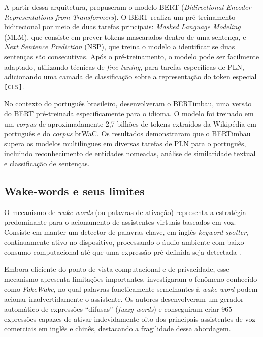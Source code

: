 \documentclass[
    12pt,                %
    openright,           %
    oneside,             %
    a4paper,             %
    english,             %
    brazil               %
]{abntex2}
\begin{document}
A partir dessa arquitetura,  propuseram o modelo BERT (\textit{Bidirectional Encoder Representations from Transformers}). O BERT realiza um pré-treinamento bidirecional por meio de duas tarefas principais: \textit{Masked Language Modeling} (MLM), que consiste em prever tokens mascarados dentro de uma sentença, e \textit{Next Sentence Prediction} (NSP), que treina o modelo a identificar se duas sentenças são consecutivas. Após o pré-treinamento, o modelo pode ser facilmente adaptado, utilizando técnicas de \textit{fine-tuning}, para tarefas específicas de PLN, adicionando uma camada de classificação sobre a representação do token especial \texttt{[CLS]}.

No contexto do português brasileiro,  desenvolveram o BERTimbau, uma versão do BERT pré-treinada especificamente para o idioma. O modelo foi treinado em um \textit{corpus} de aproximadamente 2,7 bilhões de tokens extraídos da Wikipédia em português e do \textit{corpus} brWaC. Os resultados demonstraram que o BERTimbau supera os modelos multilíngues em diversas tarefas de PLN para o português, incluindo reconhecimento de entidades nomeadas, análise de similaridade textual e classificação de sentenças.

\subsection{Wake-words e seus limites}

O mecanismo de \textit{wake-words} (ou palavras de ativação) representa a estratégia predominante para o acionamento de assistentes virtuais baseados em voz. Consiste em manter um detector de palavras-chave, em inglês \textit{keyword spotter}, continuamente ativo no dispositivo, processando o áudio ambiente com baixo consumo computacional até que uma expressão pré-definida seja detectada \cite{Garg2021}.

Embora eficiente do ponto de vista computacional e de privacidade, esse mecanismo apresenta limitações importantes.  investigaram o fenômeno conhecido como \textit{FakeWake}, no qual palavras foneticamente semelhantes à \textit{wake-word} podem acionar inadvertidamente o assistente. Os autores desenvolveram um gerador automático de expressões ``difusas'' (\textit{fuzzy words}) e conseguiram criar 965 expressões capazes de ativar indevidamente oito dos principais assistentes de voz comerciais em inglês e chinês, destacando a fragilidade dessa abordagem.
\end{document}
